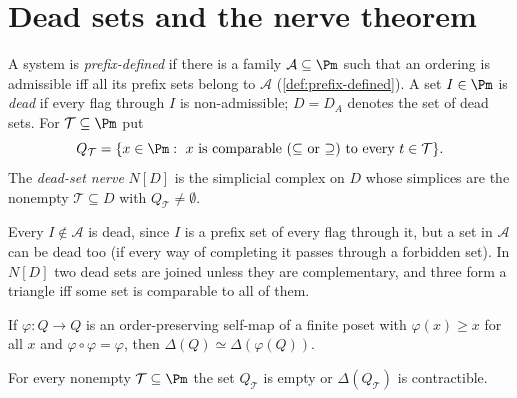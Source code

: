 \section{Dead sets and the nerve theorem}\label{sec:nerve}
\begin{definition}\label{def:dead}
A system is \emph{prefix-defined} if there is a family $\mathcal A\subseteq\Pm$ such that an ordering is admissible iff all its prefix sets belong to $\mathcal A$ (\cref{def:prefix-defined}). A set $I\in\Pm$ is \emph{dead} if every flag through $I$ is non-admissible; $D=D_A$ denotes the set of dead sets. For $\mathcal T\subseteq\Pm$ put
\[
Q_{\mathcal T}=\{x\in\Pm:\ x\text{ is comparable ($\subseteq$ or $\supseteq$) to every }t\in\mathcal T\}.
\]
The \emph{dead-set nerve} $N[D]$ is the simplicial complex on $D$ whose simplices are the nonempty $\mathcal T\subseteq D$ with $Q_{\mathcal T}\neq\emptyset$.
\end{definition}
Every $I\notin\mathcal A$ is dead, since $I$ is a prefix set of every flag through it, but a set in $\mathcal A$ can be dead too (if every way of completing it passes through a forbidden set). In $N[D]$ two dead sets are joined unless they are complementary, and three form a triangle iff some set is comparable to all of them.
\begin{lemma}\label{lem:quillen}
If $\varphi:Q\to Q$ is an order-preserving self-map of a finite poset with $\varphi(x)\ge x$ for all $x$ and $\varphi\circ\varphi=\varphi$, then $\Delta(Q)\simeq\Delta(\varphi(Q))$.
\end{lemma}
\begin{lemma}\label{lem:star}
For every nonempty $\mathcal T\subseteq\Pm$ the set $Q_{\mathcal T}$ is empty or $\Delta(Q_{\mathcal T})$ is contractible.
\end{lemma}
